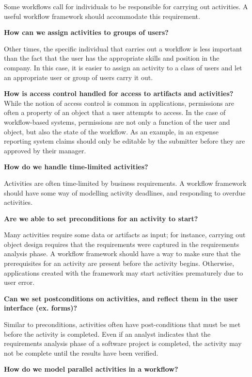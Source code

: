 \documentclass[12pt]{report}
\newcommand{\question}[1] {\vspace{3mm} \noindent \textbf{#1}}
\begin{document}
Some workflows call for individuals to be responsible for carrying out activities. A useful workflow framework should accommodate this requirement.

\question{How can we assign activities to groups of users?}

Other times, the specific individual that carries out a workflow is less important than the fact that the user has the appropriate skills and position in the company. In this case, it is easier to assign an activity to a class of users and let an appropriate user or group of users carry it out.

\question{How is access control handled for access to artifacts and activities?} 
While the notion of access control is common in applications, permissions are often a property of an object that a user attempts to access. In the case of workflow-based systems, permissions are not only a function of the user and object, but also the state of the workflow. As an example, in an expense reporting system claims should only be editable by the submitter before they are approved by their manager.

\question{How do we handle time-limited activities?}

Activities are often time-limited by business requirements. A workflow framework should have some way of modelling activity deadlines, and responding to overdue activities.

\question{Are we able to set preconditions for an activity to start?}

Many activities require some data or artifacts as input; for instance, carrying out object design requires that the requirements were captured in the requirements analysis phase. A workflow framework should have a way to make sure that the prerequisites for an activity are present before the activity begins. Otherwise, applications created with the framework may start activities prematurely due to user error.

\question{Can we set postconditions on activities, and reflect them in the user interface (ex. forms)?}

Similar to preconditions, activities often have post-conditions that must be met before the activity is completed. Even if an analyst indicates that the requirements analysis phase of a software project is completed, the activity may not be complete until the results have been verified.

\question{How do we model parallel activities in a workflow?}
\end{document}
